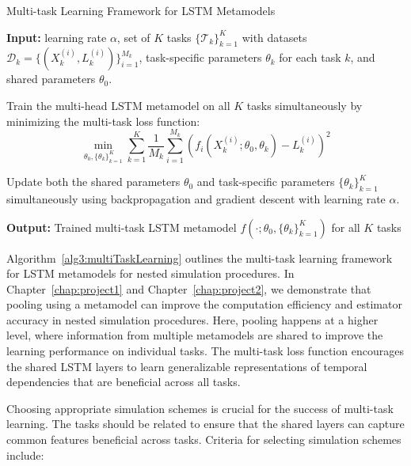 \begin{algorithm}
    \caption{Multi-task Learning Framework for LSTM Metamodels}
    \begin{algorithmic}[1] \label{alg3:multiTaskLearning}
        \STATE \textbf{Input:} learning rate $\alpha$, set of $K$ tasks $\{\mathcal{T}_k\}_{k=1}^K$ with datasets $\mathcal{D}_k = \{(X_k^{(i)}, L_k^{(i)})\}_{i=1}^{M_k}$, task-specific parameters $\theta_k$ for each task $k$, and shared parameters $\theta_0$.
    
        \STATE Train the multi-head LSTM metamodel on all $K$ tasks simultaneously by minimizing the multi-task loss function:
        \begin{equation} \label{eq3:multiTaskLoss}
            \min_{\theta_0, \{\theta_k\}_{k=1}^K} \sum_{k=1}^K \frac{1}{M_k} \sum_{i=1}^{M_k} \left( f_i(X_k^{(i)}; \theta_0, \theta_k) - L_k^{(i)} \right)^2
        \end{equation}
    
        \STATE Update both the shared parameters $\theta_0$ and task-specific parameters $\{\theta_k\}_{k=1}^K$ simultaneously using backpropagation and gradient descent with learning rate $\alpha$.
        
        \STATE \textbf{Output:} Trained multi-task LSTM metamodel $f(\cdot; \theta_0, \{\theta_k\}_{k=1}^K)$ for all $K$ tasks
    \end{algorithmic}
\end{algorithm}

Algorithm~\ref{alg3:multiTaskLearning} outlines the multi-task learning framework for LSTM metamodels for nested simulation procedures.
In Chapter~\ref{chap:project1} and Chapter~\ref{chap:project2}, we demonstrate that pooling using a metamodel can improve the computation efficiency and estimator accuracy in nested simulation procedures.
Here, pooling happens at a higher level, where information from multiple metamodels are shared to improve the learning performance on individual tasks.
The multi-task loss function encourages the shared LSTM layers to learn generalizable representations of temporal dependencies that are beneficial across all tasks.

Choosing appropriate simulation schemes is crucial for the success of multi-task learning. The tasks should be related to ensure that the shared layers can capture common features beneficial across tasks. 
Criteria for selecting simulation schemes include:

